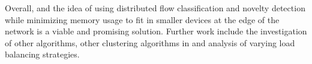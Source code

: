 Overall, \mfog and the idea of using distributed flow classification and novelty
detection while minimizing memory usage to fit in smaller devices at the edge of
the network is a viable and promising solution.
Further work include the investigation of other \nd algorithms, other clustering
algorithms in \minas and analysis of varying load balancing strategies.












